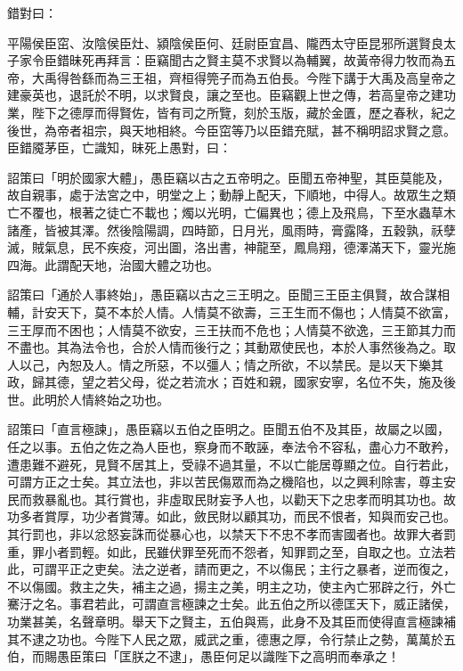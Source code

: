 \begin{pinyinscope}
錯對曰：

平陽侯臣窋、汝陰侯臣灶、潁陰侯臣何、廷尉臣宜昌、隴西太守臣昆邪所選賢良太子家令臣錯昧死再拜言：臣竊聞古之賢主莫不求賢以為輔翼，故黃帝得力牧而為五帝，大禹得咎繇而為三王祖，齊桓得筦子而為五伯長。今陛下講于大禹及高皇帝之建豪英也，退託於不明，以求賢良，讓之至也。臣竊觀上世之傳，若高皇帝之建功業，陛下之德厚而得賢佐，皆有司之所覽，刻於玉版，藏於金匱，歷之春秋，紀之後世，為帝者祖宗，與天地相終。今臣窋等乃以臣錯充賦，甚不稱明詔求賢之意。臣錯魇茅臣，亡識知，昧死上愚對，曰：

詔策曰「明於國家大體」，愚臣竊以古之五帝明之。臣聞五帝神聖，其臣莫能及，故自親事，處于法宮之中，明堂之上；動靜上配天，下順地，中得人。故眾生之類亡不覆也，根著之徒亡不載也；燭以光明，亡偏異也；德上及飛鳥，下至水蟲草木諸產，皆被其澤。然後陰陽調，四時節，日月光，風雨時，膏露降，五穀孰，祅孽滅，賊氣息，民不疾疫，河出圖，洛出書，神龍至，鳳鳥翔，德澤滿天下，靈光施四海。此謂配天地，治國大體之功也。

詔策曰「通於人事終始」，愚臣竊以古之三王明之。臣聞三王臣主俱賢，故合謀相輔，計安天下，莫不本於人情。人情莫不欲壽，三王生而不傷也；人情莫不欲富，三王厚而不困也；人情莫不欲安，三王扶而不危也；人情莫不欲逸，三王節其力而不盡也。其為法令也，合於人情而後行之；其動眾使民也，本於人事然後為之。取人以己，內恕及人。情之所惡，不以彊人；情之所欲，不以禁民。是以天下樂其政，歸其德，望之若父母，從之若流水；百姓和親，國家安寧，名位不失，施及後世。此明於人情終始之功也。

詔策曰「直言極諫」，愚臣竊以五伯之臣明之。臣聞五伯不及其臣，故屬之以國，任之以事。五伯之佐之為人臣也，察身而不敢誣，奉法令不容私，盡心力不敢矜，遭患難不避死，見賢不居其上，受祿不過其量，不以亡能居尊顯之位。自行若此，可謂方正之士矣。其立法也，非以苦民傷眾而為之機陷也，以之興利除害，尊主安民而救暴亂也。其行賞也，非虛取民財妄予人也，以勸天下之忠孝而明其功也。故功多者賞厚，功少者賞薄。如此，斂民財以顧其功，而民不恨者，知與而安己也。其行罰也，非以忿怒妄誅而從暴心也，以禁天下不忠不孝而害國者也。故罪大者罰重，罪小者罰輕。如此，民雖伏罪至死而不怨者，知罪罰之至，自取之也。立法若此，可謂平正之吏矣。法之逆者，請而更之，不以傷民；主行之暴者，逆而復之，不以傷國。救主之失，補主之過，揚主之美，明主之功，使主內亡邪辟之行，外亡騫汙之名。事君若此，可謂直言極諫之士矣。此五伯之所以德匡天下，威正諸侯，功業甚美，名聲章明。舉天下之賢主，五伯與焉，此身不及其臣而使得直言極諫補其不逮之功也。今陛下人民之眾，威武之重，德惠之厚，令行禁止之勢，萬萬於五伯，而賜愚臣策曰「匡朕之不逮」，愚臣何足以識陛下之高明而奉承之！


\end{pinyinscope}
